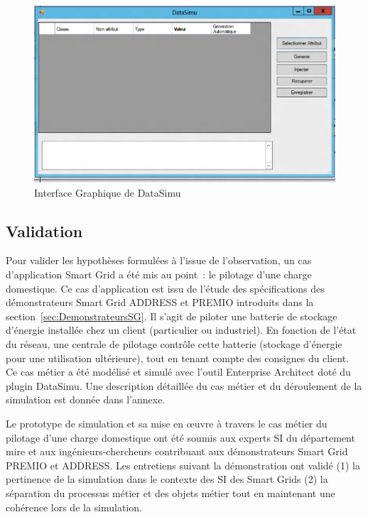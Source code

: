 \begin{figure}[!ht]
 \begin{center}
  \includegraphics[width=1\textwidth]{figures/6_methodologie/data_simu.png}
 \end{center}
 \caption{Interface Graphique de DataSimu}
 \label{fig:data_simu}
\end{figure}
				
			\subsection{Validation}
			Pour valider les hypothèses formulées à l'issue de l'observation, un cas 
d'application Smart Grid a été mis au point~: le pilotage d'une charge 
domestique. Ce cas d'application est issu de l'étude des spécifications des 
démonstrateurs Smart Grid ADDRESS et PREMIO introduits dans la 
section~\ref{sec:DemonstrateursSG}. Il s'agit de piloter une batterie de 
stockage d'énergie installée chez un client (particulier ou industriel). En 
fonction de l'état du réseau, une centrale de pilotage contrôle cette batterie 
(stockage d'énergie pour une utilisation ultérieure), tout en tenant compte des 
consignes du client. Ce cas métier a été modélisé et simulé avec l'outil 
Enterprise Architect doté du plugin DataSimu. Une description détaillée du cas 
métier et du déroulement de la simulation est donnée dans l'annexe. 
			
			Le prototype de simulation et sa mise en œuvre à travers le cas métier du 
pilotage d'une charge domestique ont été soumis aux experts SI du département 
\gls{mire} et aux ingénieurs-chercheurs contribuant aux démonstrateurs Smart 
Grid PREMIO et ADDRESS. Les entretiens suivant la démonstration ont validé (1) 
la pertinence de la simulation dans le contexte des SI des Smart Grids (2) la 
séparation du processus métier et des objets métier tout en maintenant une 
cohérence lors de la simulation. 
			
